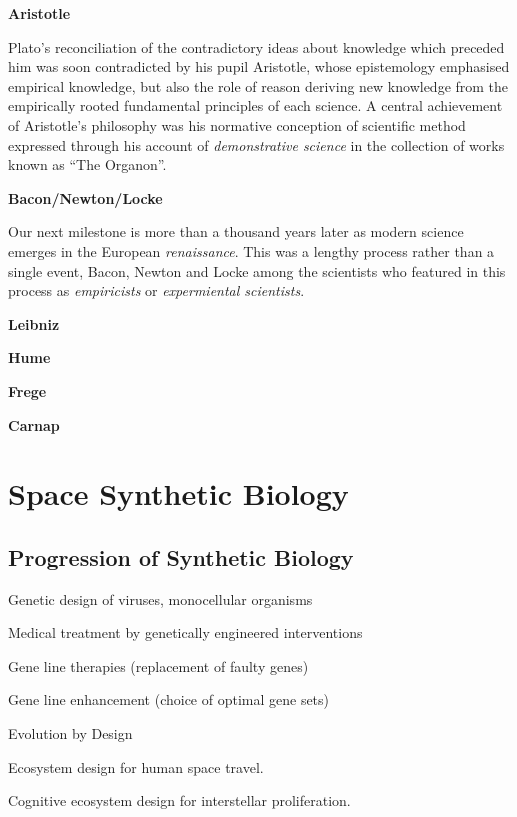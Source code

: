 \documentclass[14pt,titlepage]{extarticle}
\begin{document}
\begin{description}
  \item{\bf Aristotle}

    Plato's reconciliation of the contradictory ideas about knowledge which preceded him was soon contradicted by his pupil Aristotle, whose epistemology emphasised empirical knowledge, but also the role of reason deriving new knowledge from the empirically rooted fundamental principles of each science.
    A central achievement of Aristotle's philosophy was his normative conception of scientific method expressed through his account of \emph{demonstrative science} in the collection of works known as ``The Organon''.
    
  \item{\bf Bacon/Newton/Locke}

    Our next milestone is more than a thousand years later as modern science emerges in the European \emph{renaissance}.
    This was a lengthy process rather than a single event, Bacon, Newton and Locke among the scientists who featured in this process as \emph{empiricists} or \emph{expermiental scientists}.
    
    
  \item{\bf Leibniz}
  \item{\bf Hume}
  \item{\bf Frege}
  \item{\bf Carnap}
  \end{description}

\section{Space Synthetic Biology}

\subsection{Progression of Synthetic Biology}




\begin{description}
\item Genetic design of viruses, monocellular organisms 
\item Medical treatment by genetically engineered interventions
\item Gene line therapies (replacement of faulty genes)
\item Gene line enhancement (choice of optimal gene sets)
\item Evolution by Design
\item Ecosystem design for human space travel.
\item Cognitive ecosystem design for interstellar proliferation.
\end{description}
\end{document}
